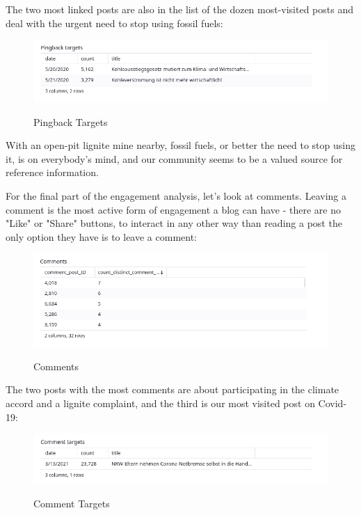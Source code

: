 The two most linked posts are also in the list of the dozen most-visited posts and deal with the urgent need to stop using fossil fuels:

\begin{figure}[H]
\centering
\caption {Pingback Targets}
\includegraphics[width=\linewidth]{images/figure16.png}
\label{fig:pingbackTargets}
\end{figure}

With an open-pit lignite mine nearby, fossil fuels, or better the need to stop using it, is on everybody's mind, and our community seems to be a valued source for reference information.

For the final part of the engagement analysis, let's look at comments. Leaving a comment is the most active form of engagement a blog can have - there are no "Like" or "Share" buttons, to interact in any other way than reading a post the only option they have is to leave a comment:

\begin{figure}[H]
\centering
\caption {Comments}
\includegraphics[width=\linewidth]{images/figure17.png}
\label{fig:comments}
\end{figure}

The two posts with the most comments are about participating in the climate accord and a lignite complaint, and the third is our most visited post on Covid-19:

\begin{figure}[H]
\centering
\caption {Comment Targets}
\includegraphics[width=\linewidth]{images/figure18.png}
\label{fig:commentTarget}
\end{figure}


